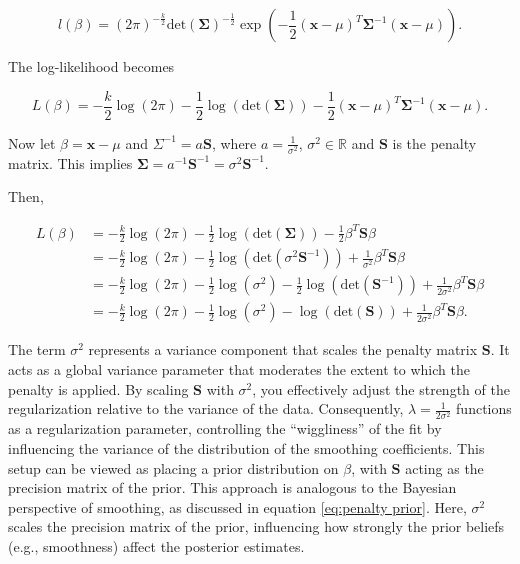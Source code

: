 \documentclass[
11pt, %
oneside, %
english, %
singlespacing, %
]{macthesis} %
\begin{document}
\[
l(\beta) = (2\pi)^{-\frac{k}{2}} \text{det}(\mathbf{\Sigma})^{-\frac{1}{2}} \exp\left(-\frac{1}{2} (\mathbf{x}-\mu)^T \mathbf{\Sigma}^{-1} (\mathbf{x}-\mu)\right).
\]

The log-likelihood becomes

\[
L(\beta) = -\frac{k}{2} \log(2\pi) -\frac{1}{2} \log(\text{det}(\mathbf{\Sigma})) -\frac{1}{2} (\mathbf{x}-\mu)^T \mathbf{\Sigma}^{-1} (\mathbf{x}-\mu).
\]

Now let \(\beta = \mathbf{x}- \mu\) and \(\Sigma^{-1}= a\mathbf{S}\), where \(a = \frac{1}{\sigma^2}\), \(\sigma^2 \in \mathbb{R}\) and \(\mathbf{S}\) is the penalty matrix. This implies \(\mathbf{\Sigma} = a^{-1}\mathbf{S}^{-1}= \sigma^2\mathbf{S}^{-1}\).

Then,

\[
\begin{aligned}
L(\beta) &= -\frac{k}{2} \log(2\pi) -\frac{1}{2} \log(\text{det}(\mathbf{\Sigma})) -\frac{1}{2} \beta^T \mathbf{S} \beta \\
        &= -\frac{k}{2} \log(2\pi) - \frac{1}{2} \log(\text{det}(\sigma^2 \mathbf{S}^{-1})) + \frac{1}{\sigma^2} \beta^T \mathbf{S} \beta \\
        &= -\frac{k}{2} \log(2\pi) - \frac{1}{2} \log(\sigma^{2}) - \frac{1}{2} \log(\text{det}(\mathbf{S}^{-1})) + \frac{1}{2\sigma^2} \beta^T \mathbf{S} \beta \\
        &= -\frac{k}{2} \log(2\pi) - \frac{1}{2} \log(\sigma^2) -  \log(\text{det}(\mathbf{S})) + \frac{1}{2\sigma^2} \beta^T \mathbf{S} \beta.
\end{aligned}
\]

The term \(\sigma^2\) represents a variance component that scales the penalty matrix \(\mathbf{S}\). It acts as a global variance parameter that moderates the extent to which the penalty is applied. By scaling \(\mathbf{S}\) with \(\sigma^2\), you effectively adjust the strength of the regularization relative to the variance of the data. Consequently, \(\lambda = \frac{1}{2\sigma^2}\) functions as a regularization parameter, controlling the ``wiggliness'' of the fit by influencing the variance of the distribution of the smoothing coefficients. This setup can be viewed as placing a prior distribution on \(\beta\), with \(\mathbf{S}\) acting as the precision matrix of the prior. This approach is analogous to the Bayesian perspective of smoothing, as discussed in equation \ref{eq:penalty prior}. Here, \(\sigma^2\) scales the precision matrix of the prior, influencing how strongly the prior beliefs (e.g., smoothness) affect the posterior estimates.
\end{document}
